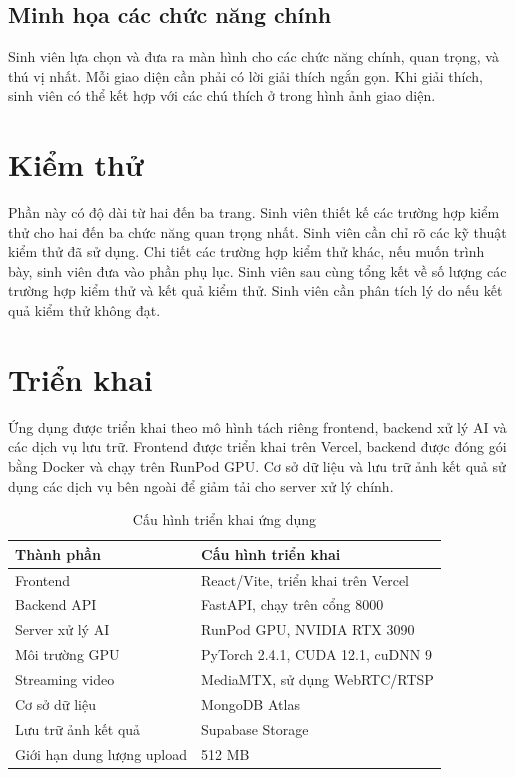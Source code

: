 \documentclass[../DoAn.tex]{subfiles}
\begin{document}
\subsection{Minh họa các chức năng chính}
Sinh viên lựa chọn và đưa ra màn hình cho các chức năng chính, quan trọng, và thú vị nhất. Mỗi giao diện cần phải có lời giải thích ngắn gọn. Khi giải thích, sinh viên có thể kết hợp với các chú thích ở trong hình ảnh giao diện.

\section{Kiểm thử}
Phần này có độ dài từ hai đến ba trang. Sinh viên thiết kế các trường hợp kiểm thử cho hai đến ba chức năng quan trọng nhất. Sinh viên cần chỉ rõ các kỹ thuật kiểm thử đã sử dụng. Chi tiết các trường hợp kiểm thử khác, nếu muốn trình bày, sinh viên đưa vào phần phụ lục.
Sinh viên sau cùng tổng kết về số lượng các trường hợp kiểm thử và kết quả kiểm thử. Sinh viên cần phân tích lý do nếu kết quả kiểm thử không đạt.
\section{Triển khai}

Ứng dụng được triển khai theo mô hình tách riêng frontend, backend xử lý AI và các dịch vụ lưu trữ. Frontend được triển khai trên Vercel, backend được đóng gói bằng Docker và chạy trên RunPod GPU. Cơ sở dữ liệu và lưu trữ ảnh kết quả sử dụng các dịch vụ bên ngoài để giảm tải cho server xử lý chính.

\begin{table}[htbp]
\centering
\begin{tabular}{p{4cm} p{10cm}}
\hline
\textbf{Thành phần} & \textbf{Cấu hình triển khai} \\ \hline
Frontend & React/Vite, triển khai trên Vercel \\ \hline
Backend API & FastAPI, chạy trên cổng 8000 \\ \hline
Server xử lý AI & RunPod GPU, NVIDIA RTX 3090 \\ \hline
Môi trường GPU & PyTorch 2.4.1, CUDA 12.1, cuDNN 9 \\ \hline
Streaming video & MediaMTX, sử dụng WebRTC/RTSP \\ \hline
Cơ sở dữ liệu & MongoDB Atlas \\ \hline
Lưu trữ ảnh kết quả & Supabase Storage \\ \hline
Giới hạn dung lượng upload & 512 MB \\ \hline
\end{tabular}
\caption{Cấu hình triển khai ứng dụng}
\label{table:deployment_config}
\end{table}
\end{document}
